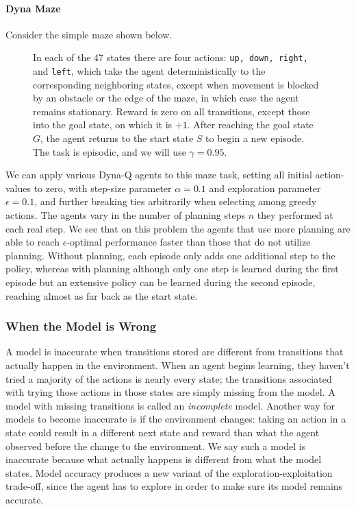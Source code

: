 \documentclass[12pt]{article}
\begin{document}
\paragraph{Dyna Maze} Consider the simple maze shown below.
\begin{figure}[h]
  \centering
  \caption{\footnotesize In each of the 47 states there are four actions: \texttt{up, down, right, } and \texttt{left}, which take the agent deterministically to the corresponding neighboring states, except when movement is blocked by an obstacle or the edge of the maze, in which case the agent remains stationary. Reward is zero on all transitions, except those into the goal state, on which it is $+1$. After reaching the goal state $G$, the agent returns to the start state $S$ to begin a new episode. The task is episodic, and we will use $\gamma = 0.95$.}
\end{figure}

We can apply various Dyna-Q agents to this maze task, setting all initial action-values to zero, with step-size parameter $\alpha = 0.1$ and exploration parameter $\epsilon = 0.1$, and further breaking ties arbitrarily when selecting among greedy actions. The agents vary in the number of planning steps $n$ they performed at each real step. We see that on this problem the agents that use more planning are able to reach $\epsilon$-optimal performance faster than those that do not utilize planning. Without planning, each episode only adds one additional step to the policy, whereas with planning although only one step is learned during the first episode but an extensive policy can be learned during the second episode, reaching almost as far back as the start state.

\subsubsection{When the Model is Wrong}
A model is inaccurate when transitions stored are different from transitions that actually happen in the environment. When an agent begins learning, they haven't tried a majority of the actions is nearly every state; the transitions associated with trying those actions in those states are simply missing from the model. A model with missing transitions is called an \emph{incomplete} model. Another way for models to become inaccurate is if the environment changes: taking an action in a state could result in a different next state and reward than what the agent observed before the change to the environment. We say such a model is inaccurate because what actually happens is different from what the model states. Model accuracy produces a new variant of the exploration-exploitation trade-off, since the agent has to explore in order to make sure its model remains accurate.
\end{document}
